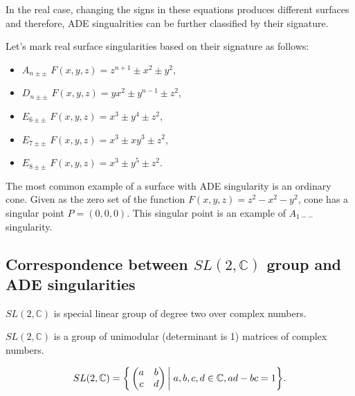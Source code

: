 In the real case, changing the signs in these equations produces different
surfaces and therefore, ADE singualrities can be further classified by their
signature.

\begin{definition}
    Let's mark real surface singularities based on their signature as follows:
    \begin{itemize}
        \item $A_{n\pm\pm}$ \hspace{5mm} $F(x,y,z)=z^{n+1}\pm x^2\pm y^2$,
              
        \item $D_{n\pm\pm}$ \hspace{5mm} $F(x,y,z)=yx^2\pm y^{n-1}\pm z^2$,
        
        \item $E_{6\pm\pm}$ \hspace{5mm} $F(x,y,z)=x^3\pm y^4\pm z^2$,
        
        \item $E_{7\pm\pm}$ \hspace{5mm} $F(x,y,z)=x^3\pm xy^3\pm z^2$,
        
        \item $E_{8\pm\pm}$ \hspace{5mm} $F(x,y,z)=x^3\pm y^5\pm z^2$.
        \end{itemize}
\end{definition}

The most common example of a surface with ADE singularity is an ordinary cone.
Given as the zero set of the function $F(x, y, z)=z^2-x^2-y^2$, cone has
a singular point $P=(0, 0, 0)$. This singular point is an example of $A_{1--}$
singularity.

\subsection*{Correspondence between $SL(2,\mathbb{C})$ group and ADE singularities}
\label{subs2.2.2}
$SL(2, \mathbb{C})$ is special linear group of degree two over complex numbers.
\begin{definition}
    $SL(2, \mathbb{C})$ is a group of unimodular (determinant is 1) matrices
    of complex numbers.

    $$SL(2, \mathbb{C}) = \bigg\{
        \begin{pmatrix}
            a & b\\ 
            c & d
          \end{pmatrix} \bigg| \hspace{1mm} a,b,c,d \in \mathbb{C}, ad-bc=1
          \bigg\}.$$
\end{definition}

